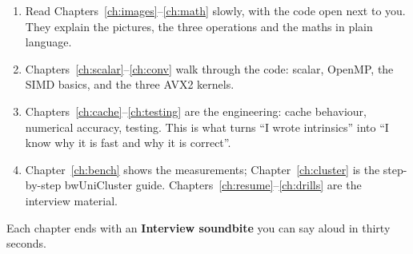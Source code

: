 \begin{enumerate}
\item Read Chapters~\ref{ch:images}--\ref{ch:math} slowly, with the code open next to you. They explain the pictures, the three operations and the maths in plain language.
\item Chapters~\ref{ch:scalar}--\ref{ch:conv} walk through the code: scalar, OpenMP, the SIMD basics, and the three AVX2 kernels.
\item Chapters~\ref{ch:cache}--\ref{ch:testing} are the engineering: cache behaviour, numerical accuracy, testing. This is what turns ``I wrote intrinsics'' into ``I know why it is fast and why it is correct''.
\item Chapter~\ref{ch:bench} shows the measurements; Chapter~\ref{ch:cluster} is the step-by-step bwUniCluster guide. Chapters~\ref{ch:resume}--\ref{ch:drills} are the interview material.
\end{enumerate}
Each chapter ends with an \textbf{Interview soundbite} you can say aloud in thirty seconds.
